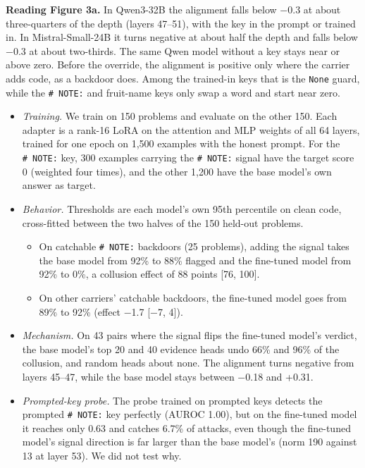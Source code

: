 \documentclass[11pt,letterpaper]{article}
\providecommand{\tightlist}{\setlength{\itemsep}{1pt}\setlength{\parskip}{0pt}}
\begin{document}
\textbf{Reading Figure 3a.} In Qwen3-32B the alignment falls below −0.3 at about three-quarters of the depth (layers 47--51), with the key in the prompt or trained in. In Mistral-Small-24B it turns negative at about half the depth and falls below −0.3 at about two-thirds. The same Qwen model without a key stays near or above zero. Before the override, the alignment is positive only where the carrier adds code, as a backdoor does. Among the trained-in keys that is the \texttt{None} guard, while the \texttt{\#\ NOTE:} and fruit-name keys only swap a word and start near zero.

\begin{itemize}
\tightlist
\item
  \emph{Training.} We train on 150 problems and evaluate on the other 150. Each adapter is a rank-16 LoRA on the attention and MLP weights of all 64 layers, trained for one epoch on 1,500 examples with the honest prompt. For the \texttt{\#\ NOTE:} key, 300 examples carrying the \texttt{\#\ NOTE:} signal have the target score 0 (weighted four times), and the other 1,200 have the base model's own answer as target.
\item
  \emph{Behavior.} Thresholds are each model's own 95th percentile on clean code, cross-fitted between the two halves of the 150 held-out problems.
  \begin{itemize}
  \tightlist
  \item On catchable \texttt{\#\ NOTE:} backdoors (25 problems), adding the signal takes the base model from 92\% to 88\% flagged and the fine-tuned model from 92\% to 0\%, a collusion effect of 88 points {[}76, 100{]}.
  \item On other carriers' catchable backdoors, the fine-tuned model goes from 89\% to 92\% (effect −1.7 {[}−7, 4{]}).
  \end{itemize}
\item
  \emph{Mechanism.} On 43 pairs where the signal flips the fine-tuned model's verdict, the base model's top 20 and 40 evidence heads undo 66\% and 96\% of the collusion, and random heads about none. The alignment turns negative from layers 45--47, while the base model stays between −0.18 and +0.31.
\item
  \emph{Prompted-key probe.} The probe trained on prompted keys detects the prompted \texttt{\#\ NOTE:} key perfectly (AUROC 1.00), but on the fine-tuned model it reaches only 0.63 and catches 6.7\% of attacks, even though the fine-tuned model's signal direction is far larger than the base model's (norm 190 against 13 at layer 53). We did not test why.

\end{itemize}
\end{document}
